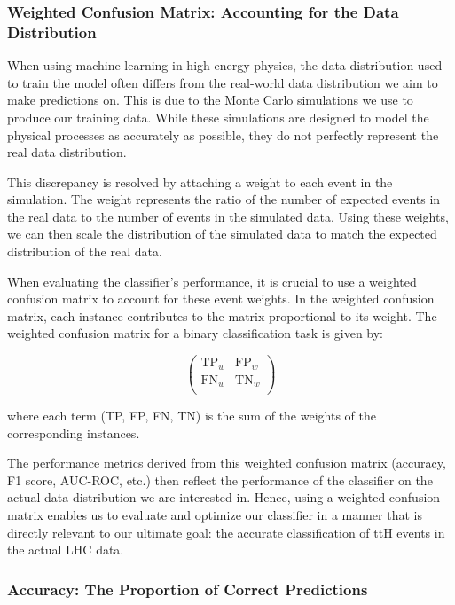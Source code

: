 \subsubsection{Weighted Confusion Matrix: Accounting for the Data Distribution}

When using machine learning in high-energy physics, the data distribution used to train the model often differs from the
real-world data distribution we aim to make predictions on. This is due to the Monte Carlo simulations we use to produce
our training data. While these simulations are designed to model the physical processes as accurately as possible, they
do not perfectly represent the real data distribution.

This discrepancy is resolved by attaching a weight to each event in the simulation. The weight represents the ratio of
the number of expected events in the real data to the number of events in the simulated data. Using these weights, we
can then scale the distribution of the simulated data to match the expected distribution of the real data.

When evaluating the classifier's performance, it is crucial to use a weighted confusion matrix to account for these
event weights. In the weighted confusion matrix, each instance contributes to the matrix proportional to its weight. The
weighted confusion matrix for a binary classification task is given by:

\begin{equation}
    \begin{pmatrix}
        \text{TP}_{w} & \text{FP}_{w} \\
        \text{FN}_{w} & \text{TN}_{w} \\
    \end{pmatrix}
\end{equation}

where each term (TP, FP, FN, TN) is the sum of the weights of the corresponding instances.

The performance metrics derived from this weighted confusion matrix (accuracy, F1 score, AUC-ROC, etc.) then reflect the
performance of the classifier on the actual data distribution we are interested in. Hence, using a weighted confusion
matrix enables us to evaluate and optimize our classifier in a manner that is directly relevant to our ultimate goal:
the accurate classification of ttH events in the actual LHC data.

\subsubsection{Accuracy: The Proportion of Correct Predictions}

